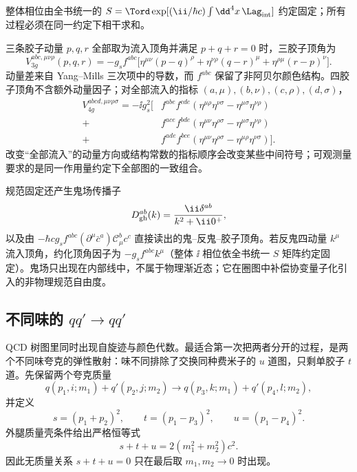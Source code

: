 整体相位由全书统一的
$S=\Tord\exp[(\ii/\hbar c)\int\dd^4 x\,\Lag_{\rm int}]$
约定固定；所有过程必须在同一约定下相干求和。

三条胶子动量 $p,q,r$ 全部取为流入顶角并满足 $p+q+r=0$ 时，三胶子顶角为
\begin{equation}
 \boxed{
 V_{3g}^{abc,\mu\nu\rho}(p,q,r)
 =-g_sf^{abc}\Big[
 \eta^{\mu\nu}(p-q)^\rho
 +\eta^{\nu\rho}(q-r)^\mu
 +\eta^{\rho\mu}(r-p)^\nu
 \Big].}
 \label{eq:qcd-three-gluon-vertex-dp10}
\end{equation}
动量差来自 Yang--Mills 三次项中的导数，而 $f^{abc}$ 保留了非阿贝尔颜色结构。四胶子顶角不含额外动量因子；对全部流入的指标 $(a,\mu),(b,\nu),(c,\rho),(d,\sigma)$，
\begin{align*}
 V_{4g}^{abcd,\mu\nu\rho\sigma}
 =-\ii g_s^2\Big[
 &f^{abe}f^{cde}(\eta^{\mu\rho}\eta^{\nu\sigma}-\eta^{\mu\sigma}\eta^{\nu\rho})\\
 +&f^{ace}f^{bde}(\eta^{\mu\nu}\eta^{\rho\sigma}-\eta^{\mu\sigma}\eta^{\nu\rho})\\
 +&f^{ade}f^{bce}(\eta^{\mu\nu}\eta^{\rho\sigma}-\eta^{\mu\rho}\eta^{\nu\sigma})
 \Big].
\end{align*}
改变“全部流入”的动量方向或结构常数的指标顺序会改变某些中间符号；可观测量要求的是同一作用量约定下全部图的一致组合。

规范固定还产生鬼场传播子
\begin{equation*}
 D_{\rm gh}^{ab}(k)=\frac{\ii\delta^{ab}}{k^2+\ii0^+},
\end{equation*}
以及由 $-\hbar c g_sf^{abc}(\partial^\mu\bar c^a)\mathscr C_\mu^b c^c$ 直接读出的鬼--反鬼--胶子顶角。若反鬼四动量 $k^\mu$ 流入顶角，约化顶角因子为 $-g_sf^{abc}k^\mu$（整体 $\ii$ 相位依全书统一 $S$ 矩阵约定固定）。鬼场只出现在内部线中，不属于物理渐近态；它在圈图中补偿协变量子化引入的非物理规范自由度。



\subsection{不同味的 $qq'\to qq'$}

QCD 树图里同时出现自旋迹与颜色代数。最适合第一次把两者分开的过程，是两个不同味夸克的弹性散射：味不同排除了交换同种费米子的 $u$ 道图，只剩单胶子 $t$ 道。先保留两个夸克质量
\begin{equation*}
 q(p_1,i;m_1)+q'(p_2,j;m_2)
 \longrightarrow
 q(p_3,k;m_1)+q'(p_4,l;m_2),
\end{equation*}
并定义
\begin{equation*}
 s=(p_1+p_2)^2,
 \qquad
 t=(p_1-p_3)^2,
 \qquad
 u=(p_1-p_4)^2.
\end{equation*}
外腿质量壳条件给出严格恒等式
\begin{equation}
 \boxed{s+t+u=2(m_1^2+m_2^2)c^2.}
 \label{eq:qqprime-mandelstam-massive-dp115}
\end{equation}
因此无质量关系 $s+t+u=0$ 只在最后取 $m_1,m_2\to0$ 时出现。

